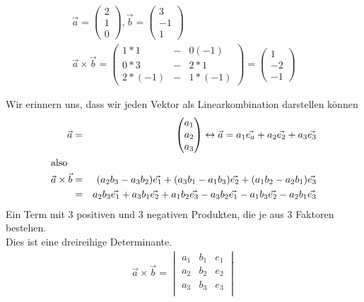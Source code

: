 \begin{myexample}
	\begin{eqnarray*}
		\vec{a} = \begin{pmatrix}2\\ 1\\ 0 \end{pmatrix}, \vec{b} = \begin{pmatrix}3\\ -1\\ 1 \end{pmatrix}\\
		\vec{a} \times \vec{b} = \begin{pmatrix} 1*1 &-& 0(-1) \\ 0* 3 &-&2 * 1 \\ 2 * (-1) &-& 1 * (-1)\end{pmatrix} = \begin{pmatrix}1 \\ -2 \\ -1 \end{pmatrix}
	\end{eqnarray*}
\end{myexample}
 \newpage
 \noindent
 Wir erinnern uns, dass wir jeden Vektor als Linearkombination darstellen können
 \begin{eqnarray*}
 \vec{a} &=& \begin{pmatrix}a_1\\a_2\\a_3\end{pmatrix} \leftrightarrow \vec{a} = a_1\vec{e_a} + a_2\vec{e_2}+a_3\vec{e_3}\\
 \shortintertext{also}
 \vec{a} \times \vec{b} &=& (a_2b_3-a_3b_2)\vec{e_1} + (a_3b_1-a_1b_3)\vec{e_2}+(a_1b_2-a_2b_1)\vec{e_3}\\
 &=&  a_2b_3\vec{e_1}+a_3b_1\vec{e_2}+a_1b_2\vec{e_3}-a_3b_2\vec{e_1} - a_1b_3\vec{e_2} - a_2b_1\vec{e_3}
 \end{eqnarray*}
 Ein Term mit 3 positiven und 3 negativen Produkten, die je aus 3 Faktoren bestehen.\\
 Dies ist eine dreireihige Determinante.
 \begin{eqnarray*}
 	\vec{a} \times \vec{b} =
 	\begin{vmatrix}
 		a_1 & b_1 & e_1\\
 		a_2 & b_2 & e_2\\
 		a_3 & b_3 & e_3\\
 	\end{vmatrix}
 \end{eqnarray*}

